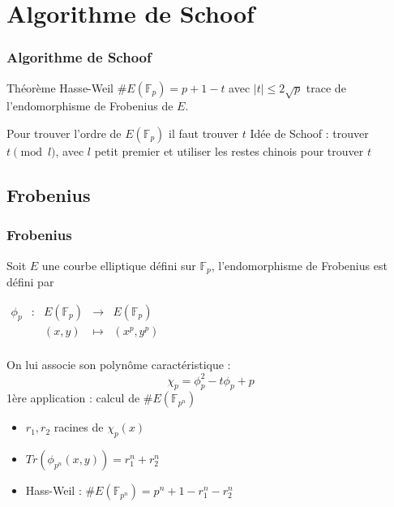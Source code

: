 \documentclass{beamer}
\begin{document}
\section{Algorithme de Schoof}
\begin{frame}
\frametitle{Algorithme de Schoof}

\begin{block}{Théorème Hasse-Weil}
$\#E(\mathbb{F}_p) = p + 1 - t$ avec $|t| \leq 2 \sqrt{p}$ trace de l'endomorphisme de Frobenius de $E$.
\end{block}
Pour trouver l'ordre de $E(\mathbb{F}_p)$ il faut trouver $t$
\newline
Idée de Schoof : trouver $t \pmod l$, avec $l$ petit premier et utiliser les restes chinois pour trouver $t$
\end{frame}

\subsection{Frobenius}
\begin{frame}
\frametitle{Frobenius}
Soit $E$ une courbe elliptique défini sur $\mathbb{F}_p$, l'endomorphisme de Frobenius est défini par 

$\begin{array}{ccccc}
\phi_p & : & E(\mathbb{F}_p) & \to & E(\mathbb{F}_p) \\
 & & (x,y) & \mapsto & (x^p, y^p) \\
\end{array}$

On lui associe son polynôme caractéristique :
\begin{equation*}
\chi_p = \phi_p^2 - t \phi_p + p 
\end{equation*}
1ère application : calcul de $\#E(\mathbb{F}_{p^n})$
\begin{itemize}
\item $r_1,r_2$ racines de $\chi_p(x)$
\item $Tr(\phi_{p^n}(x,y)) = r_1^n + r_2^n$
\item Hass-Weil : $\#E(\mathbb{F}_{p^n}) = p^n +1 - r_1^n -r_2^n$
\end{itemize}
\end{frame}
\end{document}
